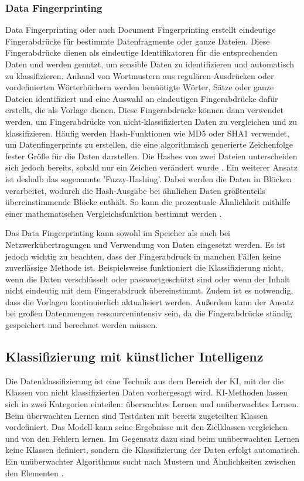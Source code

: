 \subsubsection{Data Fingerprinting} \label{fingerprint}
Data Fingerprinting oder auch Document Fingerprinting erstellt eindeutige Fingerabdrücke für bestimmte Datenfragmente oder ganze Dateien. Diese Fingerabdrücke dienen als eindeutige Identifikatoren für die entsprechenden Daten und werden genutzt, um sensible Daten zu identifizieren und automatisch zu klassifizieren. Anhand von Wortmustern aus regulären Ausdrücken oder vordefinierten Wörterbüchern werden benüötigte Wörter, Sätze oder ganze Dateien identifiziert und eine Auswahl an eindeutigen Fingerabdrücke dafür erstellt, die als Vorlage dienen. Diese Fingerabdrücke können dann verwendet werden, um Fingerabdrücke von nicht-klassifizierten Daten zu vergleichen und zu klassifizieren.
Häufig werden Hash-Funktionen wie MD5 oder SHA1 verwendet, um Datenfingerprints zu erstellen, die eine algorithmisch generierte Zeichenfolge fester Größe für die Daten darstellen. Die Hashes von zwei Dateien unterscheiden sich jedoch bereits, sobald nur ein Zeichen verändert wurde \cite{Alneyadi.2016}. Ein weiterer Ansatz ist deshalb das sogenannte 'Fuzzy-Hashing'. Dabei werden die Daten in Blöcken verarbeitet, wodurch die Hash-Ausgabe bei ähnlichen Daten größtenteils übereinstimmende Blöcke enthält. So kann die prozentuale Ähnlichkeit mithilfe einer mathematischen Vergleichsfunktion bestimmt werden \cite{Shu.2015}.

Das Data Fingerprinting kann sowohl im Speicher als auch bei Netzwerkübertragungen und Verwendung von Daten eingesetzt werden. Es ist jedoch wichtig zu beachten, dass der Fingerabdruck in manchen Fällen keine zuverlässige Methode ist. Beispielsweise funktioniert die Klassifizierung nicht, wenn die Daten verschlüsselt oder passwortgeschützt sind oder wenn der Inhalt nicht eindeutig mit dem Fingerabdruck übereinstimmt. Zudem ist es notwendig, dass die Vorlagen kontinuierlich aktualisiert werden. Außerdem kann der Ansatz bei großen Datenmengen ressourcenintensiv sein, da die Fingerabdrücke ständig gespeichert und berechnet werden müssen.


\subsection{Klassifizierung mit künstlicher Intelligenz}
Die Datenklassifizierung ist eine Technik aus dem Bereich der KI, mit der die Klassen von nicht klassifizierten Daten vorhergesagt wird. KI-Methoden lassen sich in zwei Kategorien einteilen: überwachtes Lernen und unüberwachtes Lernen. Beim überwachten Lernen sind Testdaten mit bereits zugeteilten Klassen vordefiniert. Das Modell kann seine Ergebnisse mit den Zielklassen vergleichen und von den Fehlern lernen. Im Gegensatz dazu sind beim unüberwachten Lernen keine Klassen definiert, sondern die Klassifizierung der Daten erfolgt automatisch. Ein unüberwachter Algorithmus sucht nach Mustern und Ähnlichkeiten zwischen den Elementen \cite{Frochte.2018b}.

